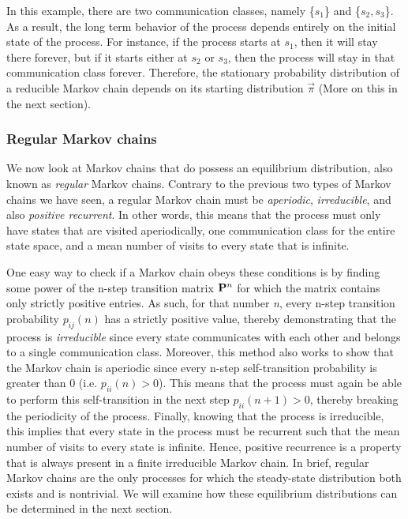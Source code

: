 \documentclass[a4paper,12pt]{article}
\theoremstyle{definition}
\let\oldtextbf\mathbf
\renewcommand{\mathbf}[1]{\oldtextbf{\boldmath #1}}
\begin{document}
	In this example, there are two communication classes, namely \{$s_1$\} and \{$s_2,s_3$\}. As a result, the long term behavior of 
	the process depends entirely on the initial state of the process. For instance, if the process starts at $s_1$, then it will stay 
	there forever, but if it starts either at $s_2$ or $s_3$, then the process will stay in that communication class forever. Therefore, 
	the stationary probability distribution of a reducible Markov chain depends on its starting distribution $\vec{\pi}$ (More on this in 
	the next section). 

	\subsubsection{Regular Markov chains}

	We now look at Markov chains that do possess an equilibrium distribution, also known as \emph{regular} Markov chains. Contrary to the previous two types of Markov chains we have seen, a regular Markov chain must be \emph{aperiodic}, \emph{irreducible}, and also \emph{positive recurrent}. In other words, this means that the process must only have states that are visited aperiodically, one communication class for the entire state space, and a mean number of visits to every state that is infinite.
	
	 One easy way to check if a Markov chain obeys these conditions is by finding some power of the n-step transition matrix $\mathbf{P}^n$ for which the matrix contains only strictly positive entries. As such, for that number \emph{n}, every n-step transition probability $p_{ij}(n)$ has a strictly positive value, thereby demonstrating that the process is \emph{irreducible} since every state communicates with each other and belongs to a single communication class.  Moreover, this method also works to show that the Markov chain is aperiodic since every n-step self-transition probability is greater than 0 (i.e. $p_{ii}(n) > 0$).  This means that the process must again be able to perform this self-transition in the next step $p_{ii}(n+1) > 0$, thereby breaking the periodicity of the process. Finally, knowing that the process is irreducible, this implies that every state in the process must be recurrent such that the mean number of visits to every state is infinite. Hence, positive recurrence is a property that is always present in a finite irreducible Markov chain. 
	 In brief, regular Markov chains are the only processes for which the steady-state distribution both exists and is nontrivial. We will examine how these equilibrium distributions can be determined in the next section.
	
\end{document}
